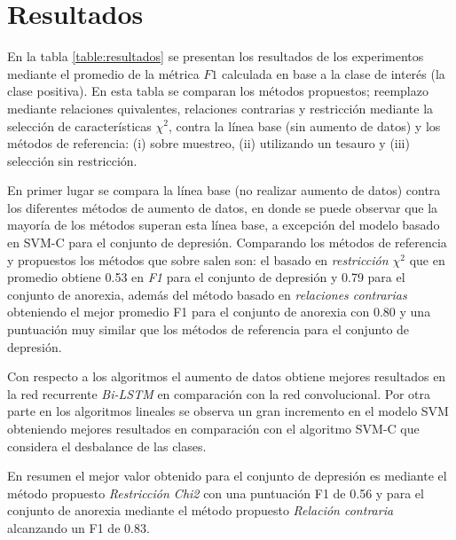 \section{Resultados}

En la tabla \ref{table:resultados} se presentan los resultados de los experimentos mediante el promedio  de la métrica $F1$ calculada en base a la clase de interés (la clase positiva).  En esta tabla se comparan los métodos propuestos; reemplazo mediante relaciones quivalentes, relaciones contrarias y restricción mediante la selección de características $\chi^2$, contra la línea base (sin aumento de datos) y los métodos de referencia: (i) sobre muestreo, (ii) utilizando un tesauro y (iii)  selección sin restricción.

En primer lugar se compara la línea base (no realizar aumento de datos) contra los diferentes métodos de aumento de datos, en donde se puede observar que la mayoría de los métodos superan esta línea base, a excepción del modelo basado en SVM-C para el conjunto de depresión. Comparando los métodos de referencia y  propuestos los métodos que sobre salen son:  el basado en \textit{restricción $\chi^2$} que en promedio obtiene 0.53 en \textit{F1} para el conjunto de depresión y 0.79 para el conjunto de anorexia, además del método basado en \textit{relaciones contrarias} obteniendo el mejor promedio F1 para el conjunto de anorexia con 0.80 y una puntuación muy similar que los métodos de referencia para el conjunto de depresión. 

Con respecto a los algoritmos el aumento de datos obtiene mejores resultados en la red recurrente \textit{Bi-LSTM} en comparación con la red convolucional. Por otra parte en los algoritmos lineales se observa un gran incremento en el modelo SVM obteniendo mejores resultados en comparación con el algoritmo SVM-C que considera el desbalance de las clases. 

En resumen el mejor valor obtenido para el conjunto de depresión es mediante el método propuesto \textit{Restricción Chi2} con una puntuación F1 de 0.56 y para el conjunto de anorexia mediante el método propuesto \textit{Relación contraria} alcanzando un F1 de 0.83.






